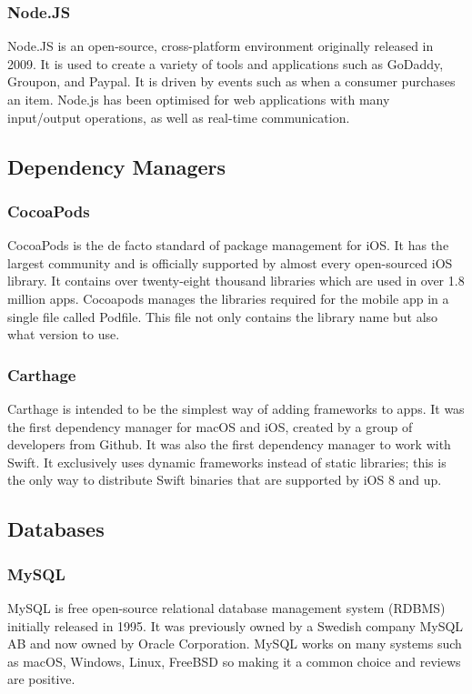 \subsubsection{Node.JS}
Node.JS \cite{node} is an open-source, cross-platform environment originally released in 2009. It is used to create a variety of tools and applications such as GoDaddy, Groupon, and Paypal. It is driven by events such as when a consumer purchases an item. Node.js has been optimised for web applications with many input/output operations, as well as real-time communication.

\subsection{Dependency Managers}

\subsubsection{CocoaPods}

CocoaPods \cite{pods} is the de facto standard of package management for iOS. It has the largest community and is officially supported by almost every open-sourced iOS library. It contains over twenty-eight thousand libraries which are used in over 1.8 million apps. Cocoapods manages the libraries required for the mobile app in a single file called Podfile. This file not only contains the library name but also what version to use.

\subsubsection{Carthage}

Carthage \cite{carthage} is intended to be the simplest way of adding frameworks to apps. It was the first dependency manager for macOS and iOS, created by a group of developers from Github. It was also the first dependency manager to work with Swift. It exclusively uses dynamic frameworks instead of static libraries; this is the only way to distribute Swift binaries that are supported by iOS 8 and up.

\subsection{Databases}

\subsubsection{MySQL}
MySQL \cite{sql} is free open-source relational database management system (RDBMS) initially released in 1995. It was previously owned by a Swedish company MySQL AB and now owned by Oracle Corporation. MySQL works on many systems such as macOS, Windows, Linux, FreeBSD so making it a common choice and reviews are
positive.

